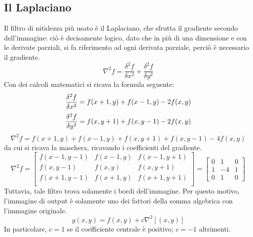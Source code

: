 \subsection{Il Laplaciano}
Il filtro di nitidezza più usato è il Laplaciano, che sfrutta il gradiente secondo dell'immagine: ciò è decisamente logico, dato che in più di una dimensione e con le derivate parziali, si fa riferimento ad ogni derivata parziale, perciò è necessario il gradiente.
\begin{equation*}
        \nabla^2 f = \frac{\delta^2 f}{\delta x^2}+\frac{\delta^2 f}{\delta y^2}
\end{equation*}
Con dei calcoli matematici si ricava la formula seguente:
\begin{equation*}
        \frac{\delta^2 f}{\delta x^2}=f(x+1,y)+f(x-1,y)-2f(x,y) \\
\end{equation*}
\begin{equation*}
        \frac{\delta^2 f}{\delta y^2}=f(x,y+1)+f(x,y-1)-2f(x,y) \\
\end{equation*}
\begin{equation*}
        \nabla^2 f=f(x+1,y)+f(x-1,y)+f(x,y+1)+f(x,y-1)-4f(x,y)
\end{equation*}
da cui si ricava la maschera, ricavando i coefficienti del gradiente.
\begin{equation*}
       \nabla^2 f=\begin{bmatrix}
            f(x-1,y-1) & f(x-1,y) & f(x-1,y+1) \\
           f(x,y-1) & f(x,y) & f(x,y+1) \\
            f(x+1,y-1) & f(x+1,y) & f(x+1,y+1) \\
        \end{bmatrix}=\begin{bmatrix}
            0 & 1 & 0 \\
            1 & -4 & 1 \\
            0 & 1 & 0
        \end{bmatrix}
\end{equation*}
Tuttavia, tale filtro trova solamente i bordi dell'immagine. Per questo motivo, l'immagine di output è solamente  uno dei fattori della somma algebrica con l'immagine originale.
\begin{equation*}
        g(x,y)=f(x,y)+c\nabla^2\left[(x,y)\right]
\end{equation*}
In particolare, $c=1$ se il coefficiente centrale è positivo; $c=-1$ altrimenti.
